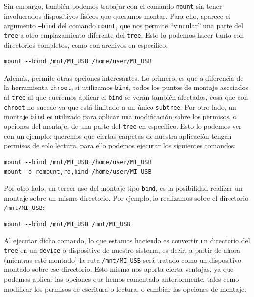 \documentclass[12pt]{article}
\begin{document}
	\noindent Sin embargo, también podemos trabajar con el comando \texttt{mount} sin tener involucrados dispositivos físicos que queramos montar. Para ello, aparece el argumento \texttt{--bind} del comando \texttt{mount}, que nos permite ``vincular'' una parte del \texttt{tree} a otro emplazamiento diferente del \texttt{tree}. Esto lo podemos hacer tanto con directorios completos, como con archivos en específico.
	
	\begin{verbatim}
mount --bind /mnt/MI_USB /home/user/MI_USB
	\end{verbatim}

	\noindent Además, permite otras opciones interesantes. Lo primero, es que a diferencia de la herramienta \texttt{chroot}, si utilizamos \texttt{bind}, todos los puntos de montaje asociados al \texttt{tree} al que queremos aplicar el \texttt{bind} se verán también afectados, cosa que con \texttt{chroot} no sucede ya que está limitado a un único \texttt{subtree}. Por otro lado, un montaje \texttt{bind} es utilizado para aplicar una modificación sobre los permisos, o opciones del montaje, de una parte del \texttt{tree} en específico. Esto lo podemos ver con un ejemplo: queremos que ciertas carpetas de nuestra aplicación tengan permisos de solo lectura, para ello podemos ejecutar los siguientes comandos:
	
	\begin{verbatim}
mount --bind /mnt/MI_USB /home/user/MI_USB
mount -o remount,ro,bind /home/user/MI_USB
	\end{verbatim}

	\noindent Por otro lado, un tercer uso del montaje tipo \texttt{bind}, es la posibilidad realizar un montaje sobre un mismo directorio. Por ejemplo, lo realizamos sobre el directorio \texttt{/mnt/MI\_USB}:
	
	\begin{verbatim}
mount --bind /mnt/MI_USB /mnt/MI_USB
	\end{verbatim}

	\noindent Al ejecutar dicho comando, lo que estamos haciendo es convertir un directorio del \texttt{tree} en un \texttt{device} o dispositivo de nuestro sistema, es decir, a partir de ahora (mientras esté montado) la ruta \texttt{/mnt/MI\_USB} será tratado como un dispositivo montado sobre ese directorio. Esto mismo nos aporta cierta ventajas, ya que podemos aplicar las opciones que hemos comentado anteriormente, tales como modificar los permisos de escritura o lectura, o cambiar las opciones de montaje.
\end{document}
